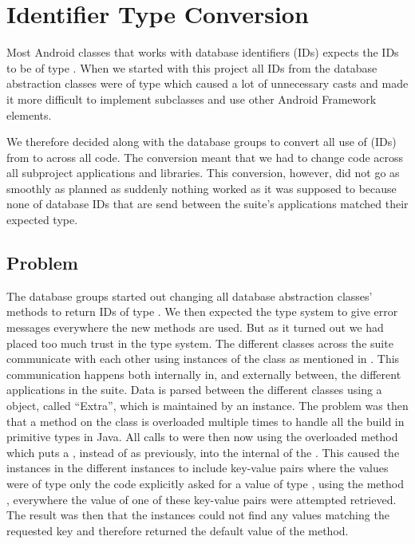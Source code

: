 \section{Identifier Type Conversion} %
\label{sec:identifier_type_conversion}


Most Android classes that works with database identifiers (IDs) expects the IDs to be of type . When we started with this project all IDs from the database abstraction classes were of type  which caused a lot of unnecessary casts and made it more difficult to implement  subclasses and use other Android Framework elements.

We therefore decided along with the database groups to convert all use of (IDs) from  to  across all code. The conversion meant that we had to change code across all subproject applications and libraries. This conversion, however, did not go as smoothly as planned as suddenly nothing worked as it was supposed to because none of database IDs that are send between the \giraf suite's applications matched their expected type.  

\subsection{Problem}
The database groups started out changing all database abstraction classes'  methods to return IDs of type . We then expected the type system to give error messages everywhere the new  methods are used. But as it turned out we had placed too much trust in the type system. The different  classes across the \giraf suite communicate with each other using instances of the  class as mentioned in . This communication happens both internally in, and externally between, the different applications in the \giraf suite. Data is parsed between the different  classes using a  object, called ``Extra'', which is maintained by an  instance. The problem was then that a method  on the  class is overloaded multiple times to handle all the build in primitive types in Java. All calls to  were then now using the overloaded method which puts a , instead of  as previously, into the internal  of the . This caused the  instances in the different  instances to include key-value pairs where the values were of type  only the code explicitly asked for a value of type , using the method , everywhere the value of one of these key-value pairs were attempted retrieved. The result was then that the  instances could not find any  values matching the requested key and therefore returned the default value of the  method.     


